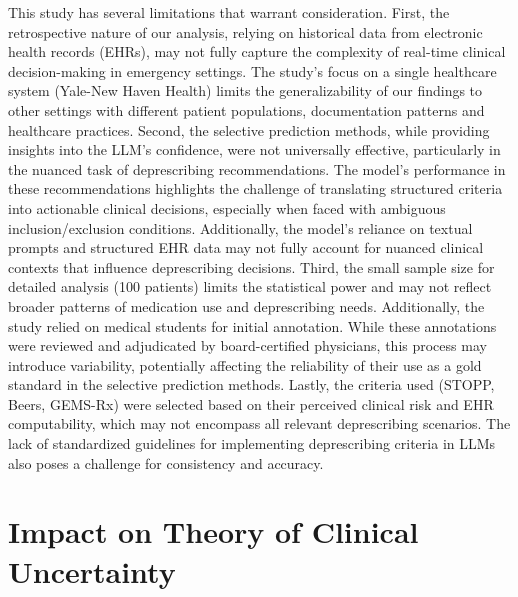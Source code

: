 This study has several limitations that warrant consideration. First, the retrospective nature of our analysis, relying on historical data from electronic health records (EHRs), may not fully capture the complexity of real-time clinical decision-making in emergency settings. The study’s focus on a single healthcare system (Yale-New Haven Health) limits the generalizability of our findings to other settings with different patient populations, documentation patterns and healthcare practices. Second, the selective prediction methods, while providing insights into the LLM's confidence, were not universally effective, particularly in the nuanced task of deprescribing recommendations. The model’s performance in these recommendations highlights the challenge of translating structured criteria into actionable clinical decisions, especially when faced with ambiguous inclusion/exclusion conditions. Additionally, the model's reliance on textual prompts and structured EHR data may not fully account for nuanced clinical contexts that influence deprescribing decisions. Third, the small sample size for detailed analysis (100 patients) limits the statistical power and may not reflect broader patterns of medication use and deprescribing needs. Additionally, the study relied on medical students for initial annotation. While these annotations were reviewed and adjudicated by board-certified physicians, this process may introduce variability, potentially affecting the reliability of their use as a gold standard in the selective prediction methods. Lastly, the criteria used (STOPP, Beers, GEMS-Rx) were selected based on their perceived clinical risk and EHR computability, which may not encompass all relevant deprescribing scenarios. The lack of standardized guidelines for implementing deprescribing criteria in LLMs also poses a challenge for consistency and accuracy.


\section{Impact on Theory of Clinical Uncertainty}

